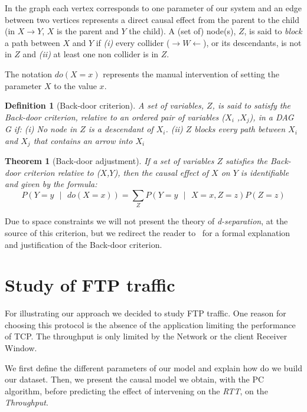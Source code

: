\documentclass[]{algotel}
\newtheorem{mydef}{Definition}
\newtheorem{mytheor}{Theorem}
\begin{document}
In the graph each vertex corresponds to one parameter of our system and an edge between two vertices represents a direct causal effect from the parent to the child (in $X \rightarrow Y$, $X$ is the parent and $Y$ the child). A (set of) node(s), $Z$, is said to \emph{block} a path between $X$ and $Y$ if \textit{(i)} every collider ($\rightarrow W \leftarrow$), or its descendants, is not in $Z$ and \textit{(ii)} at least one non collider is in $Z$.

The notation $do(X=x)$ represents the manual intervention of setting the parameter $X$ to the value $x$.

\begin{mydef}[Back-door criterion]
 A set of variables, $Z$, is said to satisfy the Back-door criterion, relative to an ordered
pair of variables ($X_{i}$ ,$X_{j}$), in a DAG G if: \textit{(i)} No node in $Z$ is a descendant of $X_{i}$. \textit{(ii)} $Z$ blocks every path between $X_{i}$ and $X_{j}$ that contains an arrow into $X_{i}$
\end{mydef}

\begin{mytheor}[Back-door adjustment]
  If a set of variables $Z$ satisfies the Back-door criterion relative to ($X$,$Y$), then the
  causal effect of $X$ on $Y$ is identifiable and given by the formula:
  \begin{equation}
    P(Y=y\mbox{ }|{}\mbox{ }do(X=x)) = \sum_{Z} P(Y=y\mbox{ }|\mbox{ }X=x,Z=z)P(Z=z)
    \label{eq:backdooradjustment}
  \end{equation}
\end{mytheor}

Due to space constraints we will not present the theory of \emph{d-separation}, at the source of this criterion, but we redirect the reader to~\cite{PearlJ2000} for a formal explanation and justification of the Back-door criterion.



\section{Study of FTP traffic}
\label{sec:ftpstudy}
For illustrating our approach we decided to study FTP traffic. One reason for choosing this protocol is the absence of the application limiting the performance of TCP. The throughput is only limited by the Network or the client Receiver Window.

We first define the different parameters of our model and explain how do we build our dataset. Then, we present the causal model we obtain, with the PC algorithm, before predicting the effect of intervening on the \emph{RTT}, on the \emph{Throughput}.
\end{document}
